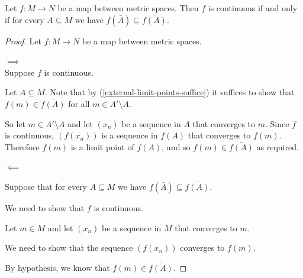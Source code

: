 \documentclass[12pt]{article}
\begin{document}
\begin{claim*}
  Let $f:M \to N$ be a map between metric spaces. Then $f$ is continuous if and only if for every
  $A \subseteq M$ we have $f(\bar A) \subseteq \bar{f(A)}$.
\end{claim*}

\begin{proof}
  Let $f:M \to N$ be a map between metric spaces.

  $\implies$\\
  Suppose $f$ is continuous.

  Let $A \subseteq M$. Note that by (\ref{external-limit-points-suffice}) it suffices to show that
  $f(m) \in \bar{f(A)}$ for all $m \in A' \setminus A$.

  So let $m \in A' \setminus A$ and let $(x_n)$ be a sequence in $A$ that converges to $m$. Since
  $f$ is continuous, $(f(x_n))$ is a sequence in $f(A)$ that converges to $f(m)$. Therefore $f(m)$
  is a limit point of $f(A)$, and so $f(m) \in \bar{f(A)}$ as required.

  $\impliedby$\\


  Suppose that for every $A \subseteq M$ we have $f(\bar A) \subseteq \bar{f(A)}$.


  We need to show that $f$ is continuous.


  Let $m \in M$ and let $(x_n)$ be a sequence in $M$ that converges to $m$.

  We need to show that the sequence $(f(x_n))$ converges to $f(m)$.

  By hypothesis, we know that $f(m) \in \bar{f(A)}$.





\end{proof}
\end{document}
